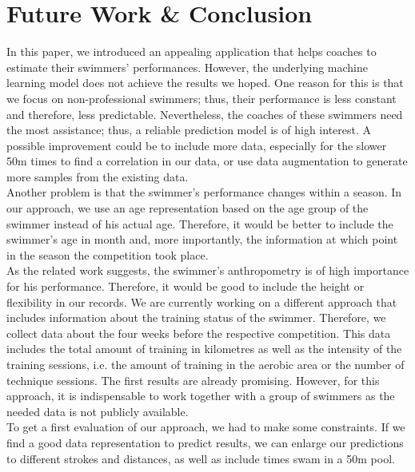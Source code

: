 \section{Future Work \& Conclusion}

In this paper, we introduced an appealing application that helps coaches to estimate their swimmers' performances. However, the underlying machine learning model does not achieve the results we hoped. One reason for this is that we focus on non-professional swimmers; thus, their performance is less constant and therefore, less predictable. Nevertheless, the coaches of these swimmers need the most assistance; thus, a reliable prediction model is of high interest. A possible improvement could be to include more data, especially for the slower 50m times to find a correlation in our data, or use data augmentation to generate more samples from the existing data.\\
Another problem is that the swimmer's performance changes within a season. In our approach, we use an age representation based on the age group of the swimmer instead of his actual age. Therefore, it would be better to include the swimmer's age in month and, more importantly, the information at which point in the season the competition took place.\\
As the related work suggests, the swimmer's anthropometry is of high importance for his performance. Therefore, it would be good to include the height or flexibility in our records. We are currently working on a different approach that includes information about the training status of the swimmer. Therefore, we collect data about the four weeks before the respective competition. This data includes the total amount of training in kilometres as well as the intensity of the training sessions, i.e. the amount of training in the aerobic area or the number of technique sessions. The first results are already promising. However, for this approach, it is indispensable to work together with a group of swimmers as the needed data is not publicly available. \\
To get a first evaluation of our approach, we had to make some constraints. If we find a good data representation to predict results, we can enlarge our predictions to different strokes and distances, as well as include times swam in a 50m pool.